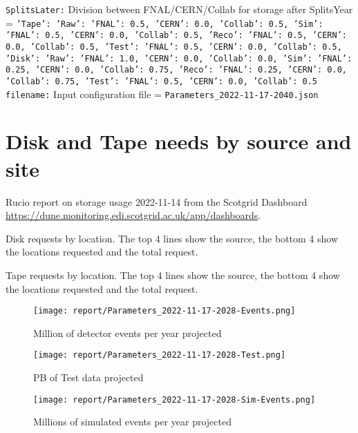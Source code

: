 {\tt SplitsLater:} Division between FNAL/CERN/Collab for storage after SplitsYear = {\tt {'Tape': {'Raw': {'FNAL': 0.5, 'CERN': 0.0, 'Collab': 0.5}, 'Sim': {'FNAL': 0.5, 'CERN': 0.0, 'Collab': 0.5}, 'Reco': {'FNAL': 0.5, 'CERN': 0.0, 'Collab': 0.5}, 'Test': {'FNAL': 0.5, 'CERN': 0.0, 'Collab': 0.5}}, 'Disk': {'Raw': {'FNAL': 1.0, 'CERN': 0.0, 'Collab': 0.0}, 'Sim': {'FNAL': 0.25, 'CERN': 0.0, 'Collab': 0.75}, 'Reco': {'FNAL': 0.25, 'CERN': 0.0, 'Collab': 0.75}, 'Test': {'FNAL': 0.5, 'CERN': 0.0, 'Collab': 0.5}}}} \\
{\tt filename:} Input configuration file = {\tt Parameters\_2022-11-17-2040.json} \\
\section{Disk and Tape needs by source and site}
\begin{table}[h]
 \centering{}
 \label{Cumulative-Tape}
\caption{Rucio report on storage usage 2022-11-14 from the Scotgrid Dashboard \href{https://dune.monitoring.edi.scotgrid.ac.uk/app/dashboards}{https://dune.monitoring.edi.scotgrid.ac.uk/app/dashboards}.}
 \end{table}
\begin{table}[h]
\centering{}\label{Cumulative-Disk
}
\caption{Disk requests by location. The top 4 lines show the source, the bottom 4 show the locations requested and the total request.}
\end{table}
\begin{table}[h]
\centering{}\label{Cumulative-Tape
}
\caption{Tape requests by location. The top 4 lines show the source, the bottom 4 show the locations requested and the total request.}
\end{table}
\begin{figure}[ht]
\centering\texttt{[image: report/Parameters\_2022-11-17-2028-Events.png]}\label{Events}
\caption{Million of detector events per year projected}
\end{figure}
\begin{figure}[ht]
\centering\texttt{[image: report/Parameters\_2022-11-17-2028-Test.png]}\label{Test}
\caption{PB of Test data projected}
\end{figure}
\begin{figure}[ht]
\centering\texttt{[image: report/Parameters\_2022-11-17-2028-Sim-Events.png]}\label{Sim-Events}
\caption{Millions of simulated events per year projected}
\end{figure}
